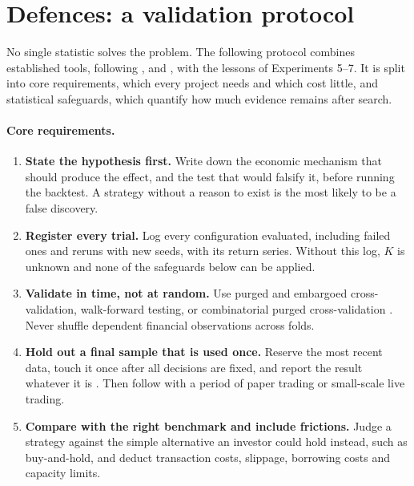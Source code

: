 \documentclass[11pt]{article}
\begin{document}
\section{Defences: a validation protocol}\label{sec:protocol}

No single statistic solves the problem. The following protocol combines established tools, following \citet{arnott2019}, \citet{lopezdeprado2018} and \citet{lopezdeprado2019crisis}, with the lessons of Experiments 5--7. It is split into core requirements, which every project needs and which cost little, and statistical safeguards, which quantify how much evidence remains after search.

\paragraph{Core requirements.}
\begin{enumerate}[leftmargin=*]
\item \textbf{State the hypothesis first.} Write down the economic mechanism that should produce the effect, and the test that would falsify it, before running the backtest. A strategy without a reason to exist is the most likely to be a false discovery.
\item \textbf{Register every trial.} Log every configuration evaluated, including failed ones and reruns with new seeds, with its return series. Without this log, $K$ is unknown and none of the safeguards below can be applied.
\item \textbf{Validate in time, not at random.} Use purged and embargoed cross-validation, walk-forward testing, or combinatorial purged cross-validation \citep{lopezdeprado2018}. Never shuffle dependent financial observations across folds.
\item \textbf{Hold out a final sample that is used once.} Reserve the most recent data, touch it once after all decisions are fixed, and report the result whatever it is \citep{cawley2010}. Then follow with a period of paper trading or small-scale live trading.
\item \textbf{Compare with the right benchmark and include frictions.} Judge a strategy against the simple alternative an investor could hold instead, such as buy-and-hold, and deduct transaction costs, slippage, borrowing costs and capacity limits.
\end{enumerate}
\end{document}
